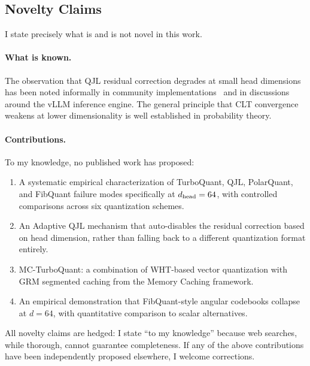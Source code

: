 \subsection{Novelty Claims}

I state precisely what is and is not novel in this work.

\paragraph{What is known.}
The observation that QJL residual correction degrades at small head
dimensions has been noted informally in community
implementations~\cite{amesianx2025turboquant, onlyterp2025turboquant}
and in discussions around the vLLM inference engine.
The general principle that CLT convergence weakens at lower
dimensionality is well established in probability theory.

\paragraph{Contributions.}

To my knowledge, no published work has proposed:
\begin{enumerate}[noitemsep,topsep=1pt,parsep=0pt,partopsep=0pt]
\item A systematic empirical characterization of TurboQuant,
      QJL, PolarQuant, and FibQuant failure modes specifically at
      $d_{\text{head}} = 64$, with controlled comparisons across six
      quantization schemes.
\item An Adaptive QJL mechanism that auto-disables the residual
      correction based on head dimension, rather than falling back
      to a different quantization format entirely.
\item MC-TurboQuant: a combination of WHT-based vector quantization
      with GRM segmented caching from the Memory Caching framework.
\item An empirical demonstration that FibQuant-style angular codebooks
      collapse at $d = 64$, with quantitative comparison to scalar
      alternatives.
\end{enumerate}

All novelty claims are hedged: I state ``to my knowledge'' because
web searches, while thorough, cannot guarantee completeness.
If any of the above contributions have been independently proposed
elsewhere, I welcome corrections.
